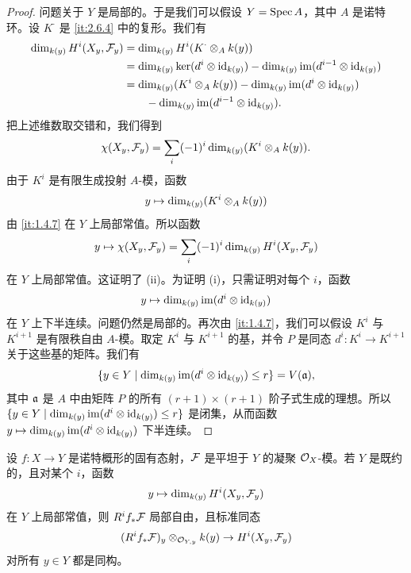 \begin{proof}
问题关于 $Y$ 是局部的。于是我们可以假设 $Y=\operatorname{Spec} A$，其中 $A$ 是诺特环。设 $K^\cdot$ 是 \ref{it:2.6.4} 中的复形。我们有
\begin{align*}
\dim_{k(y)}H^i(X_y,\mathcal{F}_y)
&=\dim_{k(y)}H^i(K^\cdot\otimes_A k(y))\\
&=\dim_{k(y)}\ker(d^i\otimes\operatorname{id}_{k(y)})-\dim_{k(y)}\operatorname{im}(d^{i-1}\otimes\operatorname{id}_{k(y)})\\
&=\dim_{k(y)}(K^i\otimes_A k(y))-\dim_{k(y)}\operatorname{im}(d^i\otimes\operatorname{id}_{k(y)})\\
&\qquad-\dim_{k(y)}\operatorname{im}(d^{i-1}\otimes\operatorname{id}_{k(y)}).
\end{align*}
把上述维数取交错和，我们得到
\[
\chi(X_y,\mathcal{F}_y)=\sum_i(-1)^i\dim_{k(y)}(K^i\otimes_A k(y)).
\]
由于 $K^i$ 是有限生成投射 $A$-模，函数
\[
y\mapsto\dim_{k(y)}(K^i\otimes_A k(y))
\]
由 \ref{it:1.4.7} 在 $Y$ 上局部常值。所以函数
\[
y\mapsto\chi(X_y,\mathcal{F}_y)=\sum_i(-1)^i\dim_{k(y)}H^i(X_y,\mathcal{F}_y)
\]
在 $Y$ 上局部常值。这证明了 (ii)。为证明 (i)，只需证明对每个 $i$，函数
\[
y\mapsto\dim_{k(y)}\operatorname{im}(d^i\otimes\operatorname{id}_{k(y)})
\]
在 $Y$ 上下半连续。问题仍然是局部的。再次由 \ref{it:1.4.7}，我们可以假设 $K^i$ 与 $K^{i+1}$ 是有限秩自由 $A$-模。取定 $K^i$ 与 $K^{i+1}$ 的基，并令 $P$ 是同态 $d^i\colon K^i\to K^{i+1}$ 关于这些基的矩阵。我们有
\[
\{y\in Y\mid\dim_{k(y)}\operatorname{im}(d^i\otimes\operatorname{id}_{k(y)})\le r\}=V(\mathfrak{a}),
\]
其中 $\mathfrak{a}$ 是 $A$ 中由矩阵 $P$ 的所有 $(r+1)\times(r+1)$ 阶子式生成的理想。所以 $\{y\in Y\mid\dim_{k(y)}\operatorname{im}(d^i\otimes\operatorname{id}_{k(y)})\le r\}$ 是闭集，从而函数 $y\mapsto\dim_{k(y)}\operatorname{im}(d^i\otimes\operatorname{id}_{k(y)})$ 下半连续。
\end{proof}

\begin{theorem}\label{it:2.6.6}
设 $f\colon X\to Y$ 是诺特概形的固有态射，$\mathcal{F}$ 是平坦于 $Y$ 的凝聚 $\mathcal{O}_X$-模。若 $Y$ 是既约的，且对某个 $i$，函数
\[
y\mapsto\dim_{k(y)}H^i(X_y,\mathcal{F}_y)
\]
在 $Y$ 上局部常值，则 $R^if_*\mathcal{F}$ 局部自由，且标准同态
\[
(R^if_*\mathcal{F})_y\otimes_{\mathcal{O}_{Y,y}}k(y)\to H^i(X_y,\mathcal{F}_y)
\]
对所有 $y\in Y$ 都是同构。
\end{theorem}

